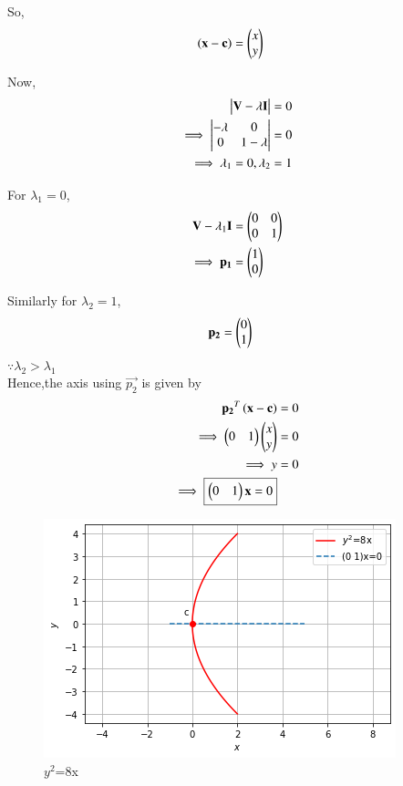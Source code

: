 \begin{enumerate}
    So,
    \begin{align}
    \left(\mathbf{x}-\mathbf{c}\right) &= \begin{pmatrix}x \\ y\end{pmatrix}
    \end{align}
    
    Now,
    \begin{align}
        \begin{vmatrix}\mathbf{V}-\lambda\mathbf{I}\end{vmatrix} &= 0 \\
        \implies \begin{vmatrix}-\lambda & 0 \\ 0 & 1-\lambda\end{vmatrix} &= 0 \\
        \implies \lambda_1 =0,\lambda_2 &= 1
    \end{align}
    
    For $\lambda_1=0$,
    \begin{align}
        \mathbf{V}-\lambda_1\mathbf{I} &= \begin{pmatrix}0 & 0 \\ 0 & 1\end{pmatrix} \\
        \implies \mathbf{p_1} &= \begin{pmatrix}1 \\ 0\end{pmatrix}
    \end{align}
    
    Similarly for $\lambda_2=1$,
    \begin{align}
        \mathbf{p_2} &=\begin{pmatrix}0 \\ 1\end{pmatrix}
    \end{align}
    $\because \lambda_2>\lambda_1$ \\
    Hence,the axis using $\vec{p_2}$ is given by
    \begin{align}
        \mathbf{p_2}^T\left(\mathbf{x}-\mathbf{c}\right) &= 0 \\
        \implies \begin{pmatrix}0 & 1\end{pmatrix}\begin{pmatrix}x \\ y\end{pmatrix} &= 0 \\
        \implies y &= 0\\
        \implies \boxed{\begin{pmatrix}0 & 1\end{pmatrix}\mathbf{x} =0}
    \end{align}
    
    
    \begin{figure}[!ht]
    \centering
    \includegraphics[width=\columnwidth]{app/2/Figures/ChallengeProblem5_3.png}
    \caption{$y^2$=8x}
    \label{quadforms/app/2/ex3}	
    \end{figure}
    

\end{enumerate}
